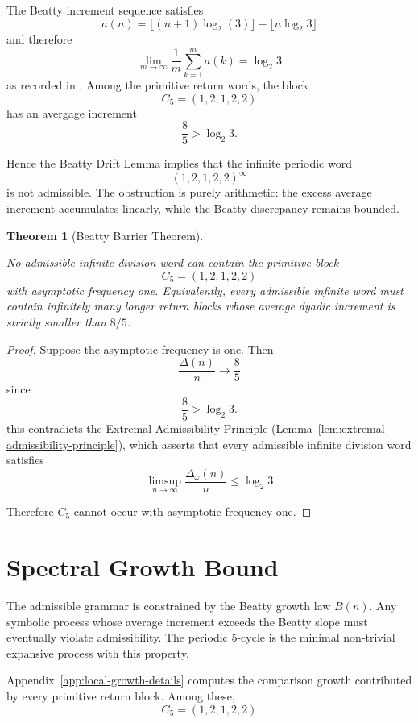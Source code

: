 \documentclass[12pt, oneside]{article}
\numberwithin{equation}{section}
\theoremstyle{definition}
\theoremstyle{plain}
\newtheorem{theorem}{Theorem}[section]
\theoremstyle{remark}
\begin{document}
The Beatty increment sequence satisfies
\[
a(n) = \lfloor (n+1) \log_2(3) \rfloor - \lfloor n \log_2 3 \rfloor
\]
and therefore
\[
\lim_{m \to \infty} \frac{1}{m} \sum_{k=1}^{m} a(k) = \log_2 3
\]
as recorded in . Among the primitive return words, the block
\[
C_5 = (1,2,1,2,2)
\]
has an avergage increment
\[
\frac{8}{5} > \log_2 3.
\]

Hence the Beatty Drift Lemma implies that the infinite periodic word
\[
(1,2,1,2,2)^\infty
\]
is not admissible. The obstruction is purely arithmetic: the excess average
increment accumulates linearly, while the Beatty discrepancy remains bounded.

\begin{theorem}[Beatty Barrier Theorem]
\label{thm:beatty-barrier}

No admissible infinite division word can contain the primitive block
\[
C_5 = (1,2,1,2,2)
\]
with asymptotic frequency one.  Equivalently, every admissible infinite
word must contain infinitely many longer return blocks whose average
dyadic increment is strictly smaller than $8/5$.
\end{theorem}

\begin{proof}
Suppose the asymptotic frequency is one. Then
\[
\frac{\Delta(n)}{n} \to \frac{8}{5}
\]
since
\[
\frac{8}{5} > \log_2 3.
\]
this contradicts the Extremal Admissibility Principle
(Lemma~\ref{lem:extremal-admissibility-principle}),
which asserts that every admissible infinite division word satisfies
\[
\limsup_{n\to\infty} \frac{\Delta_\omega(n)}{n} \le \log_2 3
\]

Therefore \(C_5\) cannot occur with asymptotic frequency one.
\end{proof}


\section{Spectral Growth Bound}
\label{sec:spectral-growth-bound}

The admissible grammar is constrained by the Beatty growth law \(B(n)\).
Any symbolic process whose average increment exceeds the Beatty slope must
eventually violate admissibility. The periodic 5-cycle is the minimal
non-trivial expansive process with this property.

Appendix~\ref{app:local-growth-details} computes the comparison growth
contributed by every primitive return block. Among these,
\[
C_5 = (1,2,1,2,2)
\]
\end{document}
